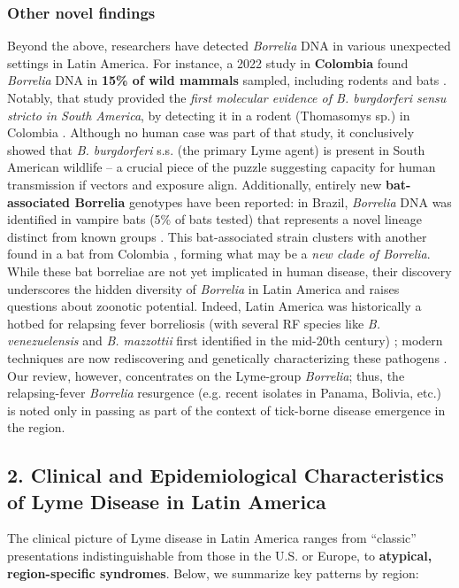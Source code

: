 \documentclass[11pt,letterpaper]{article}
\begin{document}
\subsubsection{Other novel findings}
Beyond the above, researchers have detected \textit{Borrelia} DNA in various unexpected settings in Latin America. For instance, a 2022 study in \textbf{Colombia} found \textit{Borrelia} DNA in \textbf{15\% of wild mammals} sampled, including rodents and bats \citep{Mancilla-Agrono2022}. Notably, that study provided the \textit{first molecular evidence of \textit{B. burgdorferi sensu stricto} in South America}, by detecting it in a rodent (Thomasomys sp.) in Colombia \citep{Mancilla-Agrono2022a, Mancilla-Agrono2022b}. Although no human case was part of that study, it conclusively showed that \textit{B. burgdorferi} s.s. (the primary Lyme agent) is present in South American wildlife – a crucial piece of the puzzle suggesting capacity for human transmission if vectors and exposure align. Additionally, entirely new \textbf{bat-associated Borrelia} genotypes have been reported: in Brazil, \textit{Borrelia} DNA was identified in vampire bats (5\% of bats tested) that represents a novel lineage distinct from known groups \citep{Lucca2024h}. This bat-associated strain clusters with another found in a bat from Colombia \citep{Lucca2024i}, forming what may be a \textit{new clade of Borrelia}. While these bat borreliae are not yet implicated in human disease, their discovery underscores the hidden diversity of \textit{Borrelia} in Latin America and raises questions about zoonotic potential. Indeed, Latin America was historically a hotbed for relapsing fever borreliosis (with several RF species like \textit{B. venezuelensis} and \textit{B. mazzottii} first identified in the mid-20th century) \citep{Colunga-Salas2022}; modern techniques are now rediscovering and genetically characterizing these pathogens \citep{Colunga-Salas2022a, Colunga-Salas2022b}. Our review, however, concentrates on the Lyme-group \textit{Borrelia}; thus, the relapsing-fever \textit{Borrelia} resurgence (e.g. recent isolates in Panama, Bolivia, etc.) is noted only in passing as part of the context of tick-borne disease emergence in the region.

\subsection{2. Clinical and Epidemiological Characteristics of Lyme Disease in Latin America}
The clinical picture of Lyme disease in Latin America ranges from “classic” presentations indistinguishable from those in the U.S. or Europe, to \textbf{atypical, region-specific syndromes}. Below, we summarize key patterns by region:
\end{document}
